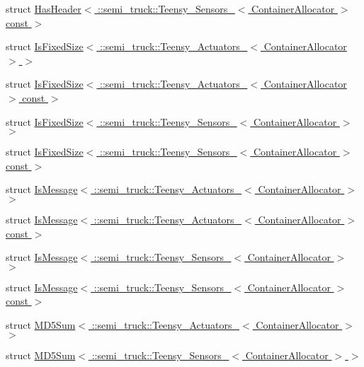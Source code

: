 \begin{DoxyCompactItemize}
\item 
struct \hyperlink{structros_1_1message__traits_1_1_has_header_3_01_1_1semi__truck_1_1_teensy___sensors___3_01_cont27420888fce5a6e96344b08bcfbbf57b}{Has\+Header$<$ \+::semi\+\_\+truck\+::\+Teensy\+\_\+\+Sensors\+\_\+$<$ Container\+Allocator $>$ const  $>$}
\item 
struct \hyperlink{structros_1_1message__traits_1_1_is_fixed_size_3_01_1_1semi__truck_1_1_teensy___actuators___3_01_container_allocator_01_4_01_4}{Is\+Fixed\+Size$<$ \+::semi\+\_\+truck\+::\+Teensy\+\_\+\+Actuators\+\_\+$<$ Container\+Allocator $>$ $>$}
\item 
struct \hyperlink{structros_1_1message__traits_1_1_is_fixed_size_3_01_1_1semi__truck_1_1_teensy___actuators___3_01e88fb587a6d6e04d6a7968cdf33bb127}{Is\+Fixed\+Size$<$ \+::semi\+\_\+truck\+::\+Teensy\+\_\+\+Actuators\+\_\+$<$ Container\+Allocator $>$ const  $>$}
\item 
struct \hyperlink{structros_1_1message__traits_1_1_is_fixed_size_3_01_1_1semi__truck_1_1_teensy___sensors___3_01_container_allocator_01_4_01_4}{Is\+Fixed\+Size$<$ \+::semi\+\_\+truck\+::\+Teensy\+\_\+\+Sensors\+\_\+$<$ Container\+Allocator $>$ $>$}
\item 
struct \hyperlink{structros_1_1message__traits_1_1_is_fixed_size_3_01_1_1semi__truck_1_1_teensy___sensors___3_01_cb53d5848a141775744a1974dc7127755}{Is\+Fixed\+Size$<$ \+::semi\+\_\+truck\+::\+Teensy\+\_\+\+Sensors\+\_\+$<$ Container\+Allocator $>$ const  $>$}
\item 
struct \hyperlink{structros_1_1message__traits_1_1_is_message_3_01_1_1semi__truck_1_1_teensy___actuators___3_01_container_allocator_01_4_01_4}{Is\+Message$<$ \+::semi\+\_\+truck\+::\+Teensy\+\_\+\+Actuators\+\_\+$<$ Container\+Allocator $>$ $>$}
\item 
struct \hyperlink{structros_1_1message__traits_1_1_is_message_3_01_1_1semi__truck_1_1_teensy___actuators___3_01_cobc29fbe598d16bac74a311be55406c9e}{Is\+Message$<$ \+::semi\+\_\+truck\+::\+Teensy\+\_\+\+Actuators\+\_\+$<$ Container\+Allocator $>$ const  $>$}
\item 
struct \hyperlink{structros_1_1message__traits_1_1_is_message_3_01_1_1semi__truck_1_1_teensy___sensors___3_01_container_allocator_01_4_01_4}{Is\+Message$<$ \+::semi\+\_\+truck\+::\+Teensy\+\_\+\+Sensors\+\_\+$<$ Container\+Allocator $>$ $>$}
\item 
struct \hyperlink{structros_1_1message__traits_1_1_is_message_3_01_1_1semi__truck_1_1_teensy___sensors___3_01_contee20f324312af52498809118a40cc274}{Is\+Message$<$ \+::semi\+\_\+truck\+::\+Teensy\+\_\+\+Sensors\+\_\+$<$ Container\+Allocator $>$ const  $>$}
\item 
struct \hyperlink{structros_1_1message__traits_1_1_m_d5_sum_3_01_1_1semi__truck_1_1_teensy___actuators___3_01_container_allocator_01_4_01_4}{M\+D5\+Sum$<$ \+::semi\+\_\+truck\+::\+Teensy\+\_\+\+Actuators\+\_\+$<$ Container\+Allocator $>$ $>$}
\item 
struct \hyperlink{structros_1_1message__traits_1_1_m_d5_sum_3_01_1_1semi__truck_1_1_teensy___sensors___3_01_container_allocator_01_4_01_4}{M\+D5\+Sum$<$ \+::semi\+\_\+truck\+::\+Teensy\+\_\+\+Sensors\+\_\+$<$ Container\+Allocator $>$ $>$}
\end{DoxyCompactItemize}
